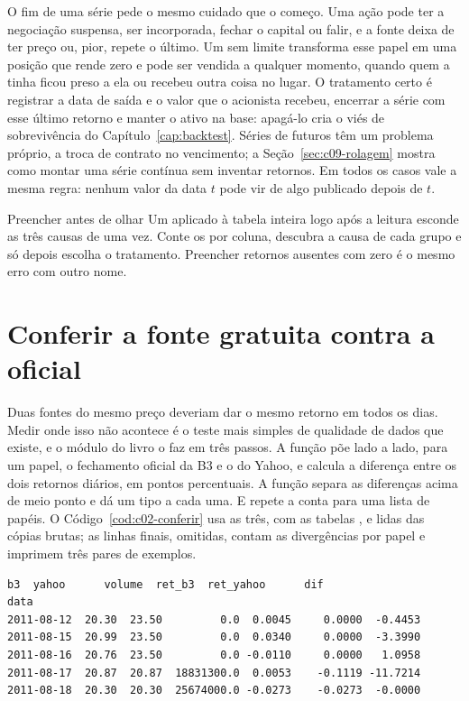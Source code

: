 O fim de uma série pede o mesmo cuidado que o começo. Uma ação pode ter a negociação suspensa, ser incorporada, fechar o capital ou falir, e a fonte deixa de ter preço ou, pior, repete o último. Um  sem limite transforma esse papel em uma posição que rende zero e pode ser vendida a qualquer momento, quando quem a tinha ficou preso a ela ou recebeu outra coisa no lugar. O tratamento certo é registrar a data de saída e o valor que o acionista recebeu, encerrar a série com esse último retorno e manter o ativo na base: apagá-lo cria o viés de sobrevivência do Capítulo~\ref{cap:backtest}. Séries de futuros têm um problema próprio, a troca de contrato no vencimento; a Seção~\ref{sec:c09-rolagem} mostra como montar uma série contínua sem inventar retornos. Em todos os casos vale a mesma regra: nenhum valor da data $t$ pode vir de algo publicado depois de $t$.

\begin{armadilha}{Preencher antes de olhar}
Um  aplicado à tabela inteira logo após a leitura esconde as três causas de uma vez. Conte os  por coluna, descubra a causa de cada grupo e só depois escolha o tratamento. Preencher retornos ausentes com zero é o mesmo erro com outro nome.
\end{armadilha}

\section{Conferir a fonte gratuita contra a oficial}
\label{sec:c02-erros}

Duas fontes do mesmo preço deveriam dar o mesmo retorno em todos os dias. Medir onde isso não acontece é o teste mais simples de qualidade de dados que existe, e o módulo  do livro o faz em três passos. A função  põe lado a lado, para um papel, o fechamento oficial da B3 e o do Yahoo, e calcula a diferença entre os dois retornos diários, em pontos percentuais. A função  separa as diferenças acima de meio ponto e dá um tipo a cada uma. E  repete a conta para uma lista de papéis. O Código~\ref{cod:c02-conferir} usa as três, com as tabelas ,  e  lidas das cópias brutas; as linhas finais, omitidas, contam as divergências por papel e imprimem três pares de exemplos.


\begin{lstlisting}[style=saida]
               b3  yahoo      volume  ret_b3  ret_yahoo      dif
data
2011-08-12  20.30  23.50         0.0  0.0045     0.0000  -0.4453
2011-08-15  20.99  23.50         0.0  0.0340     0.0000  -3.3990
2011-08-16  20.76  23.50         0.0 -0.0110     0.0000   1.0958
2011-08-17  20.87  20.87  18831300.0  0.0053    -0.1119 -11.7214
2011-08-18  20.30  20.30  25674000.0 -0.0273    -0.0273  -0.0000
\end{lstlisting}

